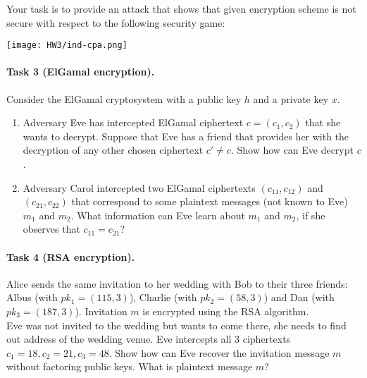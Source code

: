 \documentclass{article}
\begin{document}
Your task is to provide an attack that shows that given encryption scheme is not secure with respect to the following security game: 
\begin{center}
    \texttt{[image: HW3/ind-cpa.png]} 
\end{center}


\paragraph{Task 3 (ElGamal encryption).} Consider the ElGamal cryptosystem with a public key $h$ and a private key $x$.
\begin{enumerate}
    \item Adversary Eve has intercepted ElGamal ciphertext $c = (c_1,c_2)$ that she wants to decrypt. Suppose that Eve has a friend that provides her with the decryption of any other chosen ciphertext $c' \neq c $. Show how can Eve decrypt $c$.
    \item Adversary Carol intercepted two ElGamal ciphertexts $(c_{11} , c_{12})$ and $(c_{21} , c_{22})$ that correspond to some plaintext messages (not known to Eve) $m_1$ and $m_2$. What information can Eve learn about $m_1$ and $m_2$, if she observes that $c_{11} = c_{21}$?
\end{enumerate}

\paragraph{Task 4 (RSA encryption).} Alice sends the same invitation to her wedding with Bob to their three friends: Albus (with $pk_1=(115,3)$), Charlie (with $pk_2=(58,3)$) and Dan (with $pk_3=(187,3)$). Invitation $m$ is encrypted using the RSA algorithm. \\

Eve was not invited to the wedding but wants to come there, she needs to find out address of the wedding venue. Eve intercepts all $3$ ciphertexts $c_1= 18,c_2= 21,c_3= 48$. Show how can Eve recover the invitation message $m$ without factoring public keys. What is plaintext message $m$?
\end{document}
